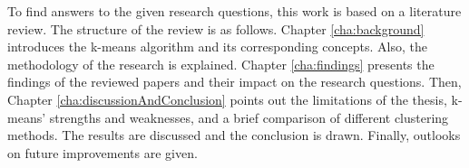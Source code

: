 To find answers to the given research questions, this work is based on a literature review.
The structure of the review is as follows.
Chapter \ref{cha:background} introduces the k-means algorithm and its corresponding concepts.
Also, the methodology of the research is explained.
Chapter \ref{cha:findings} presents the findings of the reviewed papers and their impact on the research questions.
Then, Chapter \ref{cha:discussionAndConclusion} points out the limitations of the thesis, k-means' strengths and weaknesses, and a brief comparison of different clustering methods.
The results are discussed and the conclusion is drawn.
Finally, outlooks on future improvements are given.